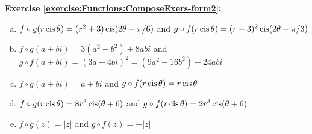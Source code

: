 \noindent\textbf{Exercise \ref{exercise:Functions:ComposeExers-form2}:}\\
\begin{enumerate}[(a)]
\item 
 $f\circ g(r \operatorname{cis} \theta) = (r^2+3)\operatorname{cis}(2\theta - \pi/6)$ and $g \circ f(r \operatorname{cis} \theta) = (r+3)^2 \operatorname{cis} (2\theta - \pi/3)$ 
\item \label{composeC2}
 $f\circ g(a + bi) = 3(a^2-b^2) + 8abi$ and $g\circ f (a + bi) = (3a+4bi)^2 = (9a^2 - 16b^2) + 24abi$ 
\item \label{composeC3}
 $f \circ g (a+bi) = a + bi$ and $g \circ f(r \operatorname{cis} \theta) = r \operatorname{cis} \theta$ 
\item \label{composeC4}
 $f \circ g(r \operatorname{cis} \theta) = 8r^3 \operatorname{cis} (\theta + 6)$  and $g \circ f(r \operatorname{cis} \theta) = 2r^3 \operatorname{cis} (\theta + 6)$ 
\item \label{composeC5}
 $f\circ g(z) = |z|$ and $g \circ f(z) = -|z|$ 
\end{enumerate}

